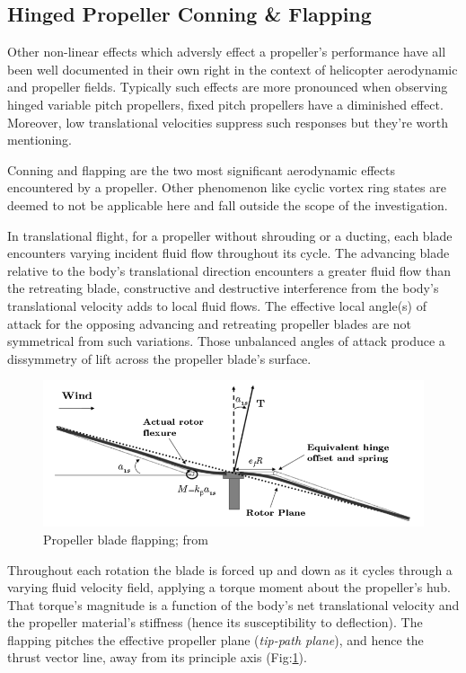 \subsection{Hinged Propeller Conning \& Flapping}
\label{subsec:dynamics.aero.flap}
Other non-linear effects which adversly effect a propeller's performance have all been well documented in their own right in the context of helicopter aerodynamic and propeller fields\cite{basichelicopter,bramwell}. Typically such effects are more pronounced when observing hinged variable pitch propellers, fixed pitch propellers have a diminished effect. Moreover, low translational velocities suppress such responses but they're worth mentioning.
\par
Conning and flapping are the two most significant aerodynamic effects encountered by a propeller. Other phenomenon like cyclic vortex ring states are deemed to not be applicable here and fall outside the scope of the investigation. 
\par
In translational flight, for a propeller without shrouding or a ducting, each blade encounters varying incident fluid flow throughout its cycle. The advancing blade relative to the body's translational direction encounters a greater fluid flow than the retreating blade, constructive and destructive interference from the body's translational velocity adds to local fluid flows. The effective local angle(s) of attack for the opposing advancing and retreating propeller blades are not symmetrical from such variations. Those unbalanced angles of attack produce a dissymmetry of lift across the propeller blade's surface.
\par
\begin{figure}[htbp]
\centering
\includegraphics[width=\textwidth]{figs/prop-flap}
\caption{Propeller blade flapping; from \cite{starmac}}
\label{fig:prop-flap}
\end{figure}
\par
Throughout each rotation the blade is forced up and down as it cycles through a varying fluid velocity field, applying a torque moment about the propeller's hub. That torque's magnitude is a function of the body's net translational velocity and the propeller material's stiffness (hence its susceptibility to deflection). The flapping pitches the effective propeller plane (\emph{tip-path plane}), and hence the thrust vector line, away from its principle axis (Fig:\ref{fig:prop-flap}).
